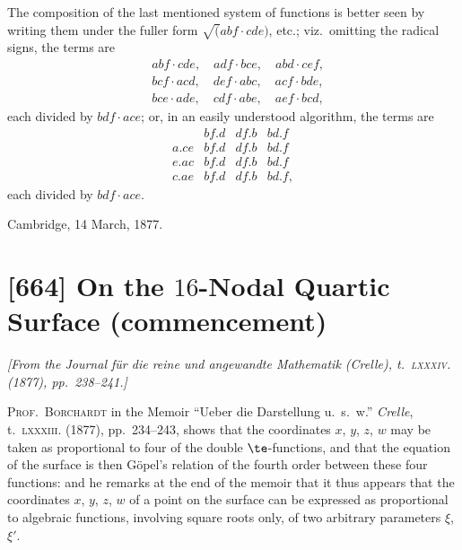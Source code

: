 \documentclass[11pt,a4paper]{book}
\begin{document}
The composition of the last mentioned system of functions is better seen by writing them under the fuller form $\surd(abf \cdot cde)$, etc.; viz.~omitting the radical signs, the terms are
\begin{align*}
& abf \cdot cde, \quad adf \cdot bce, \quad abd \cdot cef, \\
& bcf \cdot acd, \quad def \cdot abc, \quad acf \cdot bde, \\
& bce \cdot ade, \quad cdf \cdot abe, \quad aef \cdot bcd,
\end{align*}
each divided by $bdf \cdot ace$; or, in an easily understood algorithm, the terms are
\[
\begin{array}{c|ccc}
& bf.d & df.b & bd.f \\ \hline
a.ce & bf.d & df.b & bd.f \\
e.ac & bf.d & df.b & bd.f \\
c.ae & bf.d & df.b & bd.f,
\end{array}
\]
each divided by $bdf \cdot ace$.

\begin{flushright}
Cambridge, 14 March, 1877.
\end{flushright}

\newpage
\section{[664] On the $16$-Nodal Quartic Surface (commencement)}
\label{sec:664}

\noindent\textit{[From the \emph{Journal f\"ur die reine und angewandte Mathematik} (Crelle), t.~\textsc{lxxxiv}. (1877), pp.~238--241.]}

\medskip

\textsc{Prof.~Borchardt} in the Memoir ``Ueber die Darstellung u.~s.~w.'' \emph{Crelle}, t.~\textsc{lxxxiii}. (1877), pp.~234--243, shows that the coordinates $x$, $y$, $z$, $w$ may be taken as proportional to four of the double $\te$-functions, and that the equation of the surface is then G\"{o}pel's relation of the fourth order between these four functions: and he remarks at the end of the memoir that it thus appears that the coordinates $x$, $y$, $z$, $w$ of a point on the surface can be expressed as proportional to algebraic functions, involving square roots only, of two arbitrary parameters $\xi$, $\xi'$.
\end{document}
